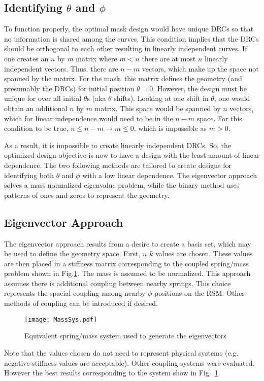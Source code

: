\documentclass[3p,times]{elsarticle}
\begin{document}
\subsection{Identifying $\theta$ and $\phi$}
To function properly, the optimal mask design would have unique DRCs so that no information is shared among the curves.  This condition implies that the DRCs should be orthogonal to each other
resulting in linearly independent curves.  If one creates an $n$ by $m$ matrix where $m<n$ there are at most $n$ linearly independent vectors.  Thus, there are $n-m$ vectors, which 
make up the space not spanned by the matrix.  For the mask, this matrix defines the geometry (and presumably the DRCs) for initial position $\theta=0$.  However, the design must be unique for 
over all initial $\theta$s (aka $\theta$ shifts).  Looking at one shift in $\theta$, one would obtain an additional $n$ by $m$ matrix.  This space would be spanned by $n$ vectors, which for linear independence would
need to be in the $n-m$ space.  For this condition to be true, $n\leq n-m\rightarrow m\leq 0$, which is impossible as $m>0$.

As a result, it is impossible to create linearly independent DRCs.  So, the optimized design objective is now to have a design with the least amount of linear dependence.  The two following methods 
are tailored to create designs for identifying both $\theta$ and $\phi$ with a low linear dependence.  The eigenvector approach solves a mass normalized eigenvalue problem, while the binary method uses 
patterns of ones and zeros to represent the geometry.

\subsection{Eigenvector Approach}
The eigenvector approach results from a desire to create a basis set, which may be used to define the geometry space.  First, $n$ $k$ values are chosen.  These values are then placed in a stiffness
matrix corresponding to the coupled spring/mass problem shown in Fig.\ref{fig:stiff}.  The mass is assumed to be normalized.  This approach assumes there is additional coupling between nearby springs.  
This choice represents the spacial coupling among nearby $\phi$ positions on the RSM.
Other methods of coupling can be introduced if desired.
\begin{figure}[ht!]
\texttt{[image: MassSys.pdf]}
\centering
\caption{Equivalent spring/mass system used to generate the eigenvectors}
\label{fig:stiff}
\end{figure}
Note that the values chosen do not need to represent physical systems (e.g. negative stiffness values are acceptable).  
Other coupling systems were evaluated.  However the best results corresponding to the system show in Fig.~\ref{fig:stiff}.  
\end{document}
